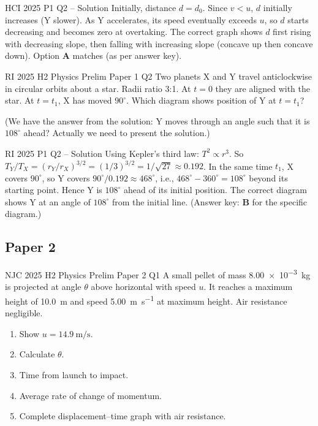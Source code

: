 \documentclass{beamer}
\begin{document}
\begin{frame}[shrink=15]{HCI 2025 P1 Q2 – Solution}
Initially, distance $d = d_0$. Since $v < u$, $d$ initially increases (Y slower). As Y accelerates, its speed eventually exceeds $u$, so $d$ starts decreasing and becomes zero at overtaking. The correct graph shows $d$ first rising with decreasing slope, then falling with increasing slope (concave up then concave down). Option \textbf{A} matches (as per answer key).
\end{frame}

\begin{frame}[t,shrink=15]{RI 2025 H2 Physics Prelim Paper 1 Q2}
Two planets X and Y travel anticlockwise in circular orbits about a star. Radii ratio 3:1. At $t=0$ they are aligned with the star. At $t=t_1$, X has moved $90^\circ$. Which diagram shows position of Y at $t=t_1$?

(We have the answer from the solution: Y moves through an angle such that it is $108^\circ$ ahead? Actually we need to present the solution.)
\end{frame}

\begin{frame}[shrink=15]{RI 2025 P1 Q2 – Solution}
Using Kepler's third law: $T^2 \propto r^3$. So $T_Y / T_X = (r_Y / r_X)^{3/2} = (1/3)^{3/2} = 1/\sqrt{27} \approx 0.192$. In the same time $t_1$, X covers $90^\circ$, so Y covers $90^\circ / 0.192 \approx 468^\circ$, i.e., $468^\circ - 360^\circ = 108^\circ$ beyond its starting point. Hence Y is $108^\circ$ ahead of its initial position. The correct diagram shows Y at an angle of $108^\circ$ from the initial line. (Answer key: \textbf{B} for the specific diagram.)
\end{frame}

\subsection{Paper 2}

\begin{frame}[t,shrink=15]{NJC 2025 H2 Physics Prelim Paper 2 Q1}
A small pellet of mass \SI{8.00e-3}{\kg} is projected at angle $\theta$ above horizontal with speed $u$. It reaches a maximum height of \SI{10.0}{\m} and speed \SI{5.00}{\meter\per\second} at maximum height. Air resistance negligible.
\begin{enumerate}
    \item[(a)(i)] Show $u = \SI{14.9}{\meter\per\second}$.
    \item[(a)(ii)] Calculate $\theta$.
    \item[(a)(iii)] Time from launch to impact.
    \item[(a)(iv)] Average rate of change of momentum.
    \item[(b)] Complete displacement–time graph with air resistance.
\end{enumerate}
\end{frame}
\end{document}
